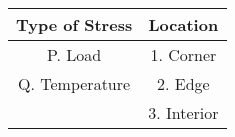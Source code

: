 \begin{tabular}[12pt]{ |c| c|}
    \hline
    \textbf{Type of Stress} & \textbf{Location}\\ 
    \hline
    P. Load & 1. Corner \\
    \hline 
    Q. Temperature & 2. Edge \\
    \hline
     & 3. Interior \\
    \hline
    \end{tabular}
